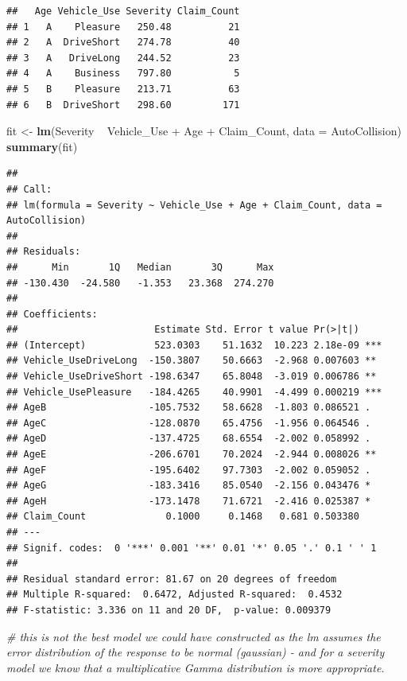 \documentclass[]{book}
\newenvironment{Shaded}{\begin{snugshade}}{\end{snugshade}}
\newcommand{\KeywordTok}[1]{\textcolor[rgb]{0.13,0.29,0.53}{\textbf{{#1}}}}
\newcommand{\DataTypeTok}[1]{\textcolor[rgb]{0.13,0.29,0.53}{{#1}}}
\newcommand{\StringTok}[1]{\textcolor[rgb]{0.31,0.60,0.02}{{#1}}}
\newcommand{\CommentTok}[1]{\textcolor[rgb]{0.56,0.35,0.01}{\textit{{#1}}}}
\newcommand{\NormalTok}[1]{{#1}}
\begin{document}
\begin{verbatim}
##   Age Vehicle_Use Severity Claim_Count
## 1   A    Pleasure   250.48          21
## 2   A  DriveShort   274.78          40
## 3   A   DriveLong   244.52          23
## 4   A    Business   797.80           5
## 5   B    Pleasure   213.71          63
## 6   B  DriveShort   298.60         171
\end{verbatim}

\begin{Shaded}
\begin{Highlighting}[]
\NormalTok{fit <-}\StringTok{ }\KeywordTok{lm}\NormalTok{(Severity ~}\StringTok{ }\NormalTok{Vehicle_Use +}\StringTok{ }\NormalTok{Age +}\StringTok{ }\NormalTok{Claim_Count, }\DataTypeTok{data =} \NormalTok{AutoCollision)}
\KeywordTok{summary}\NormalTok{(fit)}
\end{Highlighting}
\end{Shaded}

\begin{verbatim}
## 
## Call:
## lm(formula = Severity ~ Vehicle_Use + Age + Claim_Count, data = AutoCollision)
## 
## Residuals:
##      Min       1Q   Median       3Q      Max 
## -130.430  -24.580   -1.353   23.368  274.270 
## 
## Coefficients:
##                        Estimate Std. Error t value Pr(>|t|)    
## (Intercept)            523.0303    51.1632  10.223 2.18e-09 ***
## Vehicle_UseDriveLong  -150.3807    50.6663  -2.968 0.007603 ** 
## Vehicle_UseDriveShort -198.6347    65.8048  -3.019 0.006786 ** 
## Vehicle_UsePleasure   -184.4265    40.9901  -4.499 0.000219 ***
## AgeB                  -105.7532    58.6628  -1.803 0.086521 .  
## AgeC                  -128.0870    65.4756  -1.956 0.064546 .  
## AgeD                  -137.4725    68.6554  -2.002 0.058992 .  
## AgeE                  -206.6701    70.2024  -2.944 0.008026 ** 
## AgeF                  -195.6402    97.7303  -2.002 0.059052 .  
## AgeG                  -183.3416    85.0540  -2.156 0.043476 *  
## AgeH                  -173.1478    71.6721  -2.416 0.025387 *  
## Claim_Count              0.1000     0.1468   0.681 0.503380    
## ---
## Signif. codes:  0 '***' 0.001 '**' 0.01 '*' 0.05 '.' 0.1 ' ' 1
## 
## Residual standard error: 81.67 on 20 degrees of freedom
## Multiple R-squared:  0.6472, Adjusted R-squared:  0.4532 
## F-statistic: 3.336 on 11 and 20 DF,  p-value: 0.009379
\end{verbatim}

\begin{Shaded}
\begin{Highlighting}[]
\CommentTok{# this is not the best model we could have constructed as the lm assumes the error distribution of the response to be normal (gaussian) - and for a severity model we know that a multiplicative Gamma distribution is more appropriate.}
\end{Highlighting}
\end{Shaded}
\end{document}
